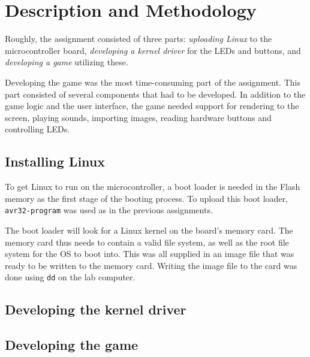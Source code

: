 \section{Description and Methodology}

Roughly, the assignment consisted of three parts: \emph{uploading Linux}
to the microcontroller board, \emph{developing a kernel driver} for the
LEDs and buttons, and \emph{developing a game} utilizing these.

Developing the game was the most time-consuming part of the assignment.
This part consisted of several components that had to be developed. In
addition to the game logic and the user interface, the game needed
support for rendering to the screen, playing sounds, importing images,
reading hardware buttons and controlling LEDs.

\subsection{Installing Linux}

To get Linux to run on the microcontroller, a boot loader is needed in
the Flash memory as the first stage of the booting process. To upload
this boot loader, \texttt{avr32-program} was used as in the previous
assignments.

The boot loader will look for a Linux kernel on the board's memory
card. The memory card thus needs to contain a valid file system, as well
as the root file system for the OS to boot into. This was all supplied
in an image file that was ready to be written to the memory card.
Writing the image file to the card was done using \texttt{dd} on the
lab computer.

\subsection{Developing the kernel driver}

\subsection{Developing the game}
